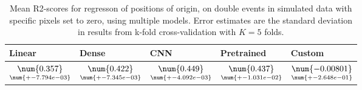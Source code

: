 \begin{table}
\centering
\caption{
Mean R2-scores for regresson of positions of origin, on double events in simulated data with specific pixels
set to zero, using multiple models. 
Error estimates are the standard deviation in results from k-fold cross-validation 
with $K=5$ folds.
}
\label{tab:regression-simulated-double-position-pixelmod-r2}
\begin{tabular}{lllll}
\toprule
                                             Linear &                                               Dense &                                                 CNN &                                          Pretrained &                                                 Custom \\
\midrule
 $\underset{\num{+- 7.794e-03 }  }{\num{ 0.357 } }$ &  $\underset{\num{+- 7.345e-03 }  }{\num{ 0.422 } }$ &  $\underset{\num{+- 4.092e-03 }  }{\num{ 0.449 } }$ &  $\underset{\num{+- 1.031e-02 }  }{\num{ 0.437 } }$ &  $\underset{\num{+- 2.648e-01 }  }{\num{ -0.00801 } }$ \\
\bottomrule
\end{tabular}
\end{table}
